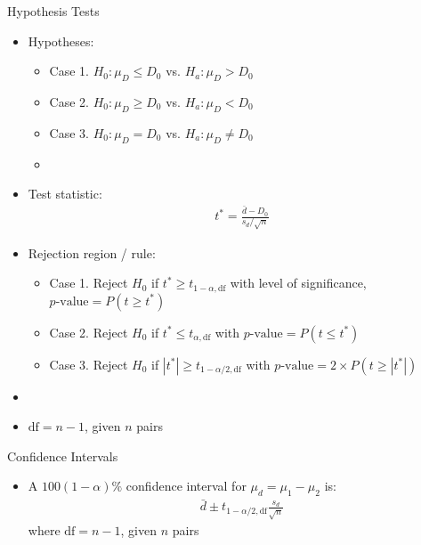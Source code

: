 \documentclass[xcolor=dvipsnames]{beamer}
\begin{document}
\begin{frame}{Hypothesis Tests}
\begin{itemize}
	\item Hypotheses:
	\begin{itemize}
		\item Case 1. $H_0: \mu_D \leq D_0$ vs. $H_a: \mu_D > D_0$
		\item Case 2. $H_0: \mu_D \geq D_0$ vs. $H_a: \mu_D < D_0$
		\item Case 3. $H_0: \mu_D = D_0$ vs. $H_a: \mu_D \neq D_0$
		\item[]
	\end{itemize}
	\item Test statistic:
	\begin{align*}
	t^* = \frac{\bar{d}-D_0}{s_d / \sqrt{n}}
	\end{align*}
	\item Rejection region / rule:
	\begin{itemize}
		\item Case 1. Reject $H_0$ if $t^* \geq t_{1-\alpha, \text{df}}$ with level of significance, $p\text{-value}=P(t \geq t^*)$
		\item Case 2. Reject $H_0$ if $t^* \leq t_{\alpha, \text{df} }$ with $p\text{-value}=P(t \leq t^*)$
		\item Case 3. Reject $H_0$ if $|t^*| \geq t_{1-\alpha / 2, \text{df}}$ with $p\text{-value}=2 \times P(t \geq |t^*|)$
	\end{itemize}
\item[]
\item $\text{df}= n-1$, given $n$ pairs
\end{itemize}
\end{frame}

\begin{frame}{Confidence Intervals}
	\begin{itemize}
		\item A $100(1-\alpha)\%$ confidence interval for $\mu_d = \mu_1 - \mu_2$ is:
		\begin{gather*}
		\bar{d} \pm t_{1-\alpha / 2, \text{df}}\frac{s_d}{\sqrt{n}}
		\end{gather*}
		where $\text{df}= n-1$, given $n$ pairs
	\end{itemize}
\end{frame}
\end{document}
